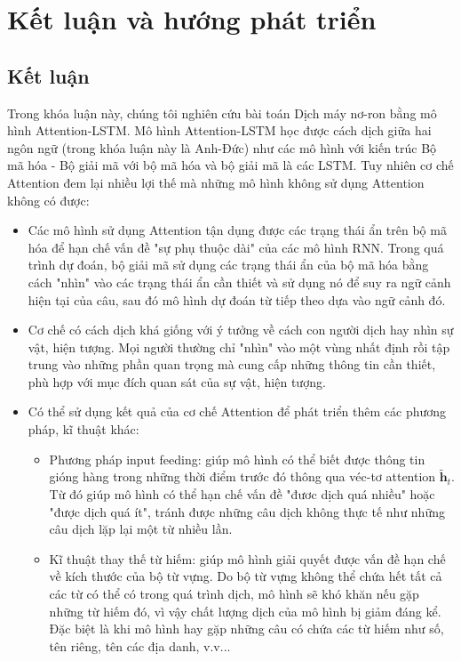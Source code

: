 \chapter{Kết luận và hướng phát triển}
\ifpdf
    \graphicspath{{Chapter5/Chapter5Figs/PNG/}{Chapter5/Chapter5Figs/PDF/}{Chapter5/Chapter5Figs/}}
\else
    \graphicspath{{Chapter5/Chapter5Figs/EPS/}{Chapter5/Chapter5Figs/}}
\fi
\label{chap_5}

\section{Kết luận}

Trong khóa luận này, chúng tôi nghiên cứu bài toán Dịch máy nơ-ron bằng mô hình Attention-LSTM. Mô hình Attention-LSTM học được cách dịch giữa hai ngôn ngữ (trong khóa luận này là Anh-Đức) như các mô hình với kiến trúc Bộ mã hóa - Bộ giải mã với bộ mã hóa và bộ giải mã là các LSTM. Tuy nhiên cơ chế Attention đem lại nhiều lợi thế mà những mô hình không sử dụng Attention không có được:
\begin{itemize}
	\item Các mô hình sử dụng Attention tận dụng được các trạng thái ẩn trên bộ mã hóa để hạn chế vấn đề "sự phụ thuộc dài" của các mô hình RNN. Trong quá trình dự đoán, bộ giải mã sử dụng các trạng thái ẩn của bộ mã hóa bằng cách "nhìn" vào các trạng thái ẩn cần thiết và sử dụng nó để suy ra ngữ cảnh hiện tại của câu, sau đó mô hình dự đoán từ tiếp theo dựa vào ngữ cảnh đó.
	\item Cơ chế có cách dịch khá giống với ý tưởng về cách con người dịch hay nhìn sự vật, hiện tượng. Mọi người thường chỉ "nhìn" vào một vùng nhất định rồi tập trung vào những phần quan trọng mà cung cấp những thông tin cần thiết, phù hợp với mục đích quan sát của sự vật, hiện tượng.
	\item Có thể sử dụng kết quả của cơ chế Attention để phát triển thêm các phương pháp, kĩ thuật khác:
	\begin{itemize}
		\item Phương pháp input feeding: giúp mô hình có thể biết được thông tin gióng hàng trong những thời điểm trước đó thông qua véc-tơ attention $\bm{\tilde{h}}_t$. Từ đó giúp mô hình có thể hạn chế vấn đề "đươc dịch quá nhiều" hoặc "được dịch quá ít", tránh được những câu dịch không thực tế như những câu dịch lặp lại một từ nhiều lần.
		\item Kĩ thuật thay thế từ hiếm: giúp mô hình giải quyết được vấn đề hạn chế về kích thước của bộ từ vựng. Do bộ từ vựng không thể chứa hết tất cả các từ có thể có trong quá trình dịch, mô hình sẽ khó khăn nếu gặp những từ hiếm đó, vì vậy chất lượng dịch của mô hình bị giảm đáng kể. Đặc biệt là khi mô hình hay gặp những câu có chứa các từ hiếm như số, tên riêng, tên các địa danh, v.v... 
	\end{itemize}
\end{itemize}

